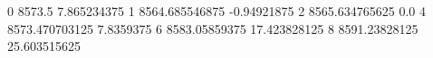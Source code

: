 0 8573.5 7.865234375
1 8564.685546875 -0.94921875
2 8565.634765625 0.0
4 8573.470703125 7.8359375
6 8583.05859375 17.423828125
8 8591.23828125 25.603515625
